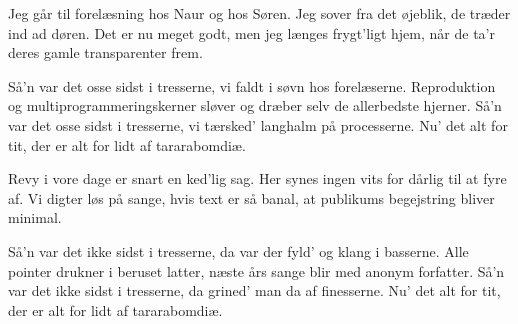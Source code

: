 \documentclass[a4paper,11pt]{article}
\begin{document}
\begin{song}
  Jeg går til forelæsning hos Naur og hos Søren.
  Jeg sover fra det øjeblik, de træder ind ad døren.
  Det er nu meget godt, men jeg længes frygt'ligt hjem,
  når de ta'r deres gamle transparenter frem.

  Så'n var det osse sidst i tresserne,
  vi faldt i søvn hos forelæserne.
  Reproduktion og multiprogrammeringskerner
  sløver og dræber selv de allerbedste hjerner.
  Så'n var det osse sidst i tresserne,
  vi tærsked' langhalm på processerne.
  Nu' det alt for tit,
  der er alt for lidt
  af tararabomdiæ.

  Revy i vore dage er snart en ked'lig sag.
  Her synes ingen vits for dårlig til at fyre af.
  Vi digter løs på sange, hvis text er så banal,
  at publikums begejstring bliver minimal.

  Så'n var det ikke sidst i tresserne,
  da var der fyld' og klang i basserne.
  Alle pointer drukner i beruset latter,
  næste års sange blir med anonym forfatter.
  Så'n var det ikke sidst i tresserne,
  da grined' man da af finesserne.
  Nu' det alt for tit,
  der er alt for lidt
  af tararabomdiæ.
\end{song}
\end{document}
